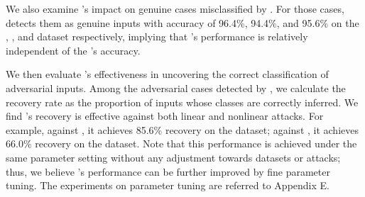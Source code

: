 We also examine \system's impact on genuine cases misclassified by \dnns. For those cases, \system detects them as genuine inputs with accuracy of 96.4\%, 94.4\%, and 95.6\% on the \mnist, \cifar, and \svhn dataset respectively, implying that \system's performance is relatively independent of the \dnn's accuracy.


%

We then evaluate \system's effectiveness in uncovering the correct classification of adversarial inputs. Among the adversarial cases detected by \system, we calculate the recovery rate as the proportion of inputs whose classes are correctly inferred. We find \system's recovery is effective against both linear and nonlinear attacks. For example, against \ttha, it achieves 85.6\% recovery on the \mnist dataset; against \ttpa, it achieves 66.0\% recovery on the \cifar dataset. Note that this performance is achieved under the same parameter setting without any adjustment towards datasets or attacks; thus, we believe \system's performance can be further improved by fine parameter tuning. The experiments on parameter tuning are referred to Appendix E.



%
%

